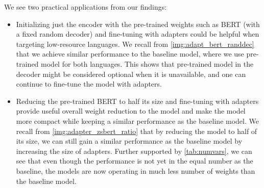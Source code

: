 We see two practical applications from our findings:
\begin{itemize}
    \item Initializing just the encoder with the pre-trained weights such as BERT (with a fixed random decoder) and fine-tuning with adapters could be helpful when targeting low-resource languages. 
    We recall from \cref{img:adapt_bert_randdec} that we achieve similar performance to the baseline model, where we use pre-trained model for both languages. This shows that pre-trained model in the decoder might be considered optional when it is unavailable, and one can continue to fine-tune the model with adapters.
    \item Reducing the pre-trained BERT to half its size and fine-tuning with adapt\-ers provide 
    useful overall weight reduction to the model and make the model more compact while keeping a similar performance as the baseline model. 
    We recall from \cref{img:adapter_zsbert_ratio} that by reducing the model to half of its size, we can still gain a similar performance as the baseline model by increasing the size of adapters. Further supported by \cref{tab:numvars}, we can see that even though the performance is not yet in the equal number as the baseline, the models are now operating in much less number of weights than the baseline model.

\end{itemize}

